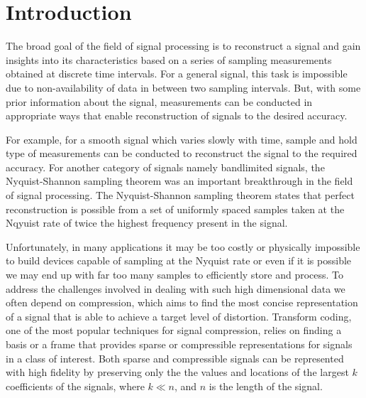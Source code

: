 \chapter{Introduction}
The broad goal of the field of signal processing is to reconstruct a signal and gain insights into its characteristics based on a series of sampling measurements obtained at discrete time intervals. For a general signal, this task is impossible due to non-availability of data in between two sampling intervals. But, with some prior information about the signal, measurements can be conducted in appropriate ways that enable reconstruction of signals to the desired accuracy.

For example, for a smooth signal which varies slowly with time, sample and hold type of measurements can be conducted to reconstruct the signal to the 
required accuracy.  For another category of signals namely bandlimited signals, the Nyquist-Shannon sampling theorem was an important breakthrough in the field of signal processing. The Nyquist-Shannon sampling theorem states that perfect reconstruction is possible from a set of uniformly spaced samples taken at the Nqyuist rate of twice the highest frequency present in the signal.

Unfortunately, in many applications it may be too costly or physically impossible to build devices capable of sampling at the Nyquist rate or even if it is possible we may end up with far too many samples to efficiently store and process. To address the challenges involved in dealing with such high dimensional data we often depend on compression, which aims to find the most concise representation of a signal that is able to achieve a target level of distortion. Transform coding, one of the most popular techniques for signal compression, relies on finding a basis or a frame that provides sparse or compressible representations for signals in a class of interest. Both sparse and compressible signals can be represented with high fidelity by preserving only the the values and locations of the largest $k$ coefficients of the signals, where $k \ll n$, and $n$ is the length of the signal.

